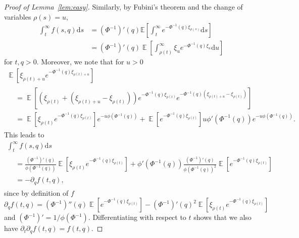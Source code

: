 \documentclass[AHL,Unicode,longabstracts,published]{cedram}
\newcommand{\bbE}{\mathbb{E}}
\DeclareMathOperator{\E}{\mathbb{E}}
\newcommand{\dd}{\mathrm{d}}
\begin{document}
\begin{proof}[Proof of Lemma~\ref{lem:easy}]
Similarly, by Fubini's theorem and the change of variables $\rho(s)=u$,
\begin{align*}
\int_t^\infty f(s,q) \dd s &= (\Phi^{-1})'(q)\bbE\left[\int_t^\infty e^{-\Phi^{-1}(q) \xi_{\rho(s)}} \dd s\right]\\
&= (\Phi^{-1})'(q) \E\left[\int_{\rho(t)}^{\infty} \xi_u e^{-\Phi^{-1}(q) \xi_u} \dd u \right]
\end{align*}
for $t,q>0$. Moreover, we note that for $u> 0$
\begin{multline*}
\E\left[\xi_{\rho(t)+u} e^{-\Phi^{-1}(q) \xi_{\rho(t)+u}}\right]\\
\begin{aligned}
&= \E\left[\left(\xi_{\rho(t)} +\left(\xi_{\rho(t) + u} - \xi_{\rho(t)}\right)\right) e^{-\Phi^{-1}(q) \xi_{\rho(t)}} e^{-\Phi^{-1}(q) \left(\xi_{\rho(t) + u} - \xi_{\rho(t)}\right)} \right]\\
&= \E\left[\xi_{\rho(t)} e^{-\Phi^{-1}(q)\xi_{\rho(t)}} \right] e^{-u \phi\left(\Phi^{-1}(q)\right)} + \E\left[e^{-\Phi^{-1}(q) \xi_{\rho(t)}}\right] u \phi'\left(\Phi^{-1}(q)\right) e^{-u \phi(\Phi^{-1}(q))}.
\end{aligned}
\end{multline*}
This leads to
\begin{multline*}
\int_t^\infty f(s,q) \dd s\\
\begin{aligned}
&= \frac{\left(\Phi^{-1}\right)'(q)}{\phi\left(\Phi^{-1}(q)\right)} \E\left[\xi_{\rho(t)} e^{-\Phi^{-1}(q)\xi_{\rho(t)}} \right] + \phi'\left(\Phi^{-1}(q)\right) \frac{\left(\Phi^{-1}\right)'(q)}{\phi\left(\Phi^{-1}(q)\right)^2} \E\left[e^{-\Phi^{-1}(q) \xi_{\rho(t)}} \right]\\
&= -\partial_q f(t,q),
\end{aligned}
\end{multline*}
since by definition of $f$
\[
\partial_q f(t,q) = (\Phi^{-1})''(q)\E\left[e^{-\Phi^{-1}(q) \xi_{\rho(t)}}\right] - (\Phi^{-1})'(q)^2 \E\left[\xi_{\rho(t)} e^{-\Phi^{-1}(q)\xi_{\rho(t)}} \right]
\]
and $(\Phi^{-1})' = 1/\phi (\Phi^{-1})$. Differentiating with respect to $t$ shows that we also have $\partial_t \partial_q f(t,q) = f(t,q)$.


\end{proof}
\end{document}
